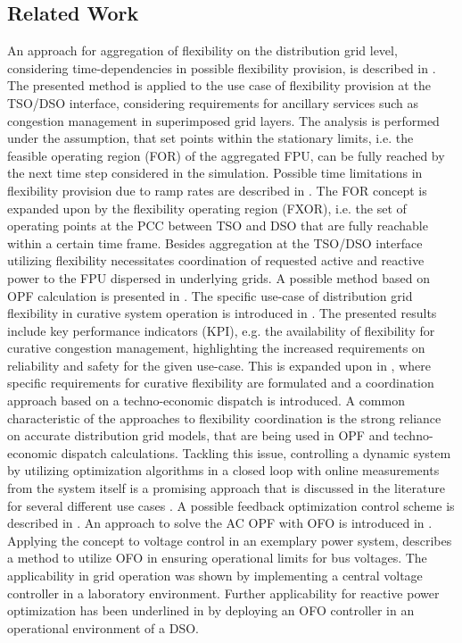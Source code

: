 \documentclass[conference,a4paper]{IEEEtran}
\begin{document}
\subsection{Related Work}
An approach for aggregation of flexibility on the distribution grid level, considering time-dependencies in possible flexibility provision, is described in \cite{Contreras_2019}. The presented method is applied to the use case of flexibility provision at the TSO/DSO interface, considering requirements for ancillary services such as congestion management in superimposed grid layers. The analysis is performed under the assumption, that set points within the stationary limits, i.e. the feasible operating region (FOR) of the aggregated FPU, can be fully reached by the next time step considered in the simulation. Possible time limitations in flexibility provision due to ramp rates are described in \cite{Riaz_2019}. The FOR concept is expanded upon by the flexibility operating region (FXOR), i.e. the set of operating points at the PCC between TSO and DSO that are fully reachable within a certain time frame. Besides aggregation at the TSO/DSO interface utilizing flexibility necessitates coordination of requested active and reactive power to the FPU dispersed in underlying grids. A possible method based on OPF calculation is presented in \cite{Frueh_2023}. The specific use-case of distribution grid flexibility in curative system operation is introduced in \cite{Kolster_2020}. The presented results include key performance indicators (KPI), e.g. the availability of flexibility for curative congestion management, highlighting the increased requirements on reliability and safety for the given use-case. This is expanded upon in \cite{Kolster_2022}, where specific requirements for curative flexibility are formulated and a coordination approach based on a techno-economic dispatch is introduced. A common characteristic of the approaches to flexibility coordination is the strong reliance on accurate distribution grid models, that are being used in OPF and techno-economic dispatch calculations. Tackling this issue, controlling a dynamic system by utilizing optimization algorithms in a closed loop with online measurements from the system itself is a promising approach that is discussed in the literature for several different use cases \cite{Hau_2021}. A possible feedback optimization control scheme is described in \cite{Härberle_2020}. An approach to solve the AC OPF with OFO is introduced in \cite{Picallo_2023}. Applying the concept to voltage control in an exemplary power system, \cite{Ortmann_2020} describes a method to utilize OFO in ensuring operational limits for bus voltages. The applicability in grid operation was shown by implementing a central voltage controller in a laboratory environment. Further applicability for reactive power optimization has been underlined in \cite{Ortmann_2023} by deploying an OFO controller in an operational environment of a DSO.
\end{document}
